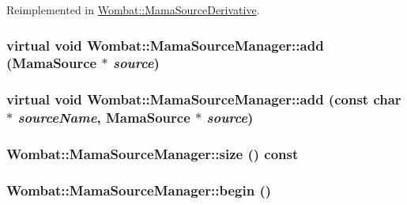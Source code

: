Reimplemented in \hyperlink{classWombat_1_1MamaSourceDerivative_a2c54840ec7876ccfd3213b021976132d}{Wombat::MamaSourceDerivative}.\hypertarget{classWombat_1_1MamaSourceManager_ae36a1971e3107d9623faef31c4d867bc}{
\subsubsection[{add}]{\setlength{\rightskip}{0pt plus 5cm}virtual void Wombat::MamaSourceManager::add ({\bf MamaSource} $\ast$ {\em source})}}
\label{classWombat_1_1MamaSourceManager_ae36a1971e3107d9623faef31c4d867bc}
\hypertarget{classWombat_1_1MamaSourceManager_a1cd90bf091046284bd5c18bfc03269a6}{
\subsubsection[{add}]{\setlength{\rightskip}{0pt plus 5cm}virtual void Wombat::MamaSourceManager::add (const char $\ast$ {\em sourceName}, \/  {\bf MamaSource} $\ast$ {\em source})}}
\label{classWombat_1_1MamaSourceManager_a1cd90bf091046284bd5c18bfc03269a6}
\hypertarget{classWombat_1_1MamaSourceManager_ac20ceefc8eea2e1c7e63c151f92a9b1f}{
\subsubsection[{size}]{ Wombat::MamaSourceManager::size () const}}
\label{classWombat_1_1MamaSourceManager_ac20ceefc8eea2e1c7e63c151f92a9b1f}
\hypertarget{classWombat_1_1MamaSourceManager_aa267a206bb4ff04f82bd50926ba930b3}{
\subsubsection[{begin}]{ Wombat::MamaSourceManager::begin ()}}

